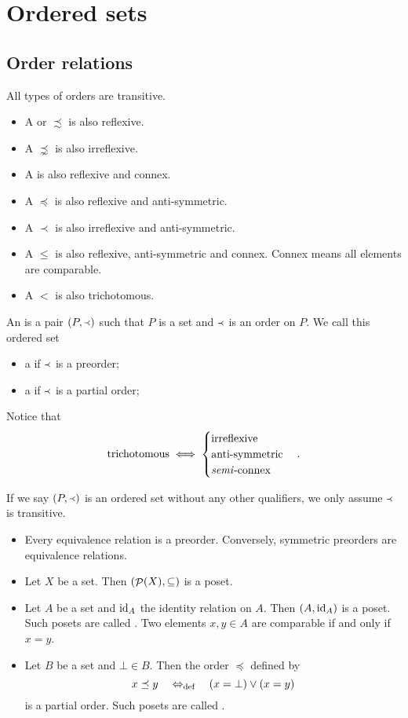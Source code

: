 \chapter{Ordered sets}
\section{Order relations}
\begin{definition}
All types of orders are transitive.
\begin{itemize}
\item A  or  $\precsim$ is also reflexive.
\item A  $\precnsim$ is also irreflexive.
\item A  is also reflexive and connex.
\item A  $\preceq$ is also reflexive and anti-symmetric.
\item A  $\prec$ is also irreflexive and anti-symmetric.
\item A  $\leq$ is also reflexive, anti-symmetric and connex. Connex means all elements are comparable.
\item A  $<$ is also trichotomous.
\end{itemize}
An  is a pair $\left( P,\Yleft \right)$ such that $P$ is a set and $\Yleft$ is an order on $P$. We call this ordered set
\begin{itemize}
\item a  if $\Yleft$ is a preorder;
\item a  if $\Yleft$ is a partial order;
\end{itemize}
\end{definition}
Notice that
\[ \text{trichotomous} \iff \begin{cases}
\text{irreflexive} \\ \text{anti-symmetric} \\ \text{\textit{semi}-connex}
\end{cases}. \]

If we say $\left( P,\Yleft \right)$ is an ordered set without any other qualifiers, we only assume $\Yleft$ is transitive.

\begin{example}
\begin{itemize}
\item Every equivalence relation is a preorder. Conversely, symmetric preorders are equivalence relations.
\item Let $X$ be a set. Then $\left( \mathop{\mathcal{P}}(X), \subseteq \right)$ is a poset.
\item Let $A$ be a set and $\operatorname{id}_A$ the identity relation on $A$. Then $\left( A,\operatorname{id}_A \right)$ is a poset. Such posets are called . Two elements $x,y\in A$ are comparable if and only if $x=y$.
\item Let $B$ be a set and $\bot\in B$. Then the order $\preceq$ defined by
\[ x \preceq y \quad\Leftrightarrow_{\text{def}}\quad (x=\bot) \lor (x = y) \]
is a partial order. Such posets are called .
\end{itemize}
\end{example}

